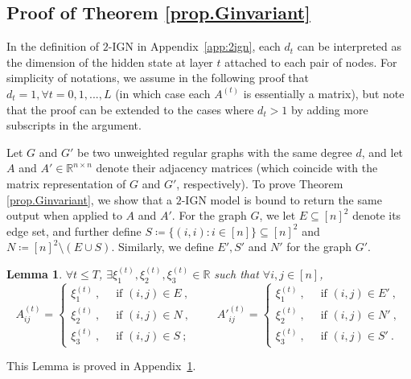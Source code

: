 \documentclass{article}
\newtheorem{lemma}{Lemma}
\begin{document}
\subsection{Proof of Theorem \ref{prop.Ginvariant}}

In the definition of $2$-IGN in Appendix~\ref{app:2ign}, each $d_{t}$ can be interpreted as the dimension of the hidden state at layer $t$ attached to each pair of nodes. For simplicity of notations,  we assume in the following proof that $d_{t} = 1, \forall t = 0, 1, ..., L$ (in which case each $A^{(t)}$ is essentially a matrix), but note that
the proof can be extended to the cases where $d_{t} > 1$ by adding more subscripts in the argument.

Let $G$ and $G'$ be two unweighted regular graphs with the same degree $d$, and let $A$ and $A' \in \mathbb{R}^{n \times n}$ denote their adjacency matrices (which coincide with the matrix representation of $G$ and $G'$, respectively).
To prove Theorem \ref{prop.Ginvariant}, we show that a $2$-IGN model is bound to return the same output when applied to $A$ and $A'$. For the graph $G$, we let $E \subseteq [n]^2$ denote its edge set, and further define $S \coloneqq \{(i, i): i \in [n] \} \subseteq [n]^2$ and $N \coloneqq [n]^2 \setminus (E \cup S)$. Similarly, we define $E', S'$ and $N'$ for the graph $G'$.

\begin{lemma}
\label{lem.A_ind}
$\forall t \leq T$, $\exists \xi_1^{(t)}, \xi_2^{(t)}, \xi_3^{(t)} \in \mathbb{R}$ such that $\forall i, j \in [n]$,
\begin{equation}
\label{eq:At_ind}
    A^{(t)}_{ij} = \begin{cases}
    \xi_1^{(t)}~,&~ \text{ if } (i, j) \in E~, \\
    \xi_2^{(t)}~,&~ \text{ if } (i, j) \in N~, \\
    \xi_3^{(t)}~,&~ \text{ if } (i, j) \in S~;
    \end{cases}
    \qquad 
    A'^{(t)}_{ij} = \begin{cases}
    \xi_1^{(t)}~,&~ \text{ if } (i, j) \in E'~, \\
    \xi_2^{(t)}~,&~ \text{ if } (i, j) \in N'~, \\
    \xi_3^{(t)}~,&~ \text{ if } (i, j) \in S'~.
    \end{cases}
\end{equation}
\end{lemma}
This Lemma is proved in Appendix~\ref{lem.A_ind}.
\end{document}
